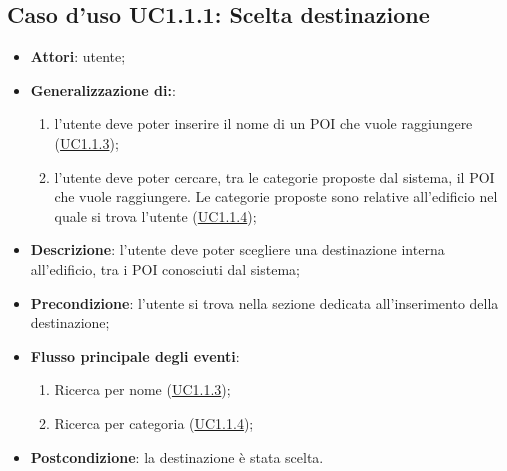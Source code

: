 \documentclass[../AnalisiDeiRequisiti.tex]{subfiles}
\begin{document}
\subsection{Caso d'uso UC1.1.1: Scelta destinazione}
\begin{itemize}
\item \textbf{Attori}: utente;

        \item \textbf{Generalizzazione di:}:
          \begin{enumerate}
          \item l'utente deve poter inserire il nome di un POI che vuole raggiungere (\hyperlink{UC1.1.3}{UC1.1.3});
          \item l'utente deve poter cercare, tra le categorie proposte dal sistema, il POI che vuole raggiungere. Le categorie proposte sono relative all'edificio nel quale si trova l'utente (\hyperlink{UC1.1.4}{UC1.1.4});

      \end{enumerate}
\item \textbf{Descrizione}: l'utente deve poter scegliere una destinazione interna all'edificio, tra i POI conosciuti dal sistema; 
      \item \textbf{Precondizione}: l'utente si trova nella sezione dedicata all'inserimento della destinazione;

        \item \textbf{Flusso principale degli eventi}:
          \begin{enumerate}
          \item Ricerca per nome (\hyperlink{UC1.1.3}{UC1.1.3});
          \item Ricerca per categoria (\hyperlink{UC1.1.4}{UC1.1.4});

      \end{enumerate}
    \item \textbf{Postcondizione}: la destinazione è stata scelta.
  \end{itemize}
\hypertarget{UC1.1.2}{}
\end{document}
